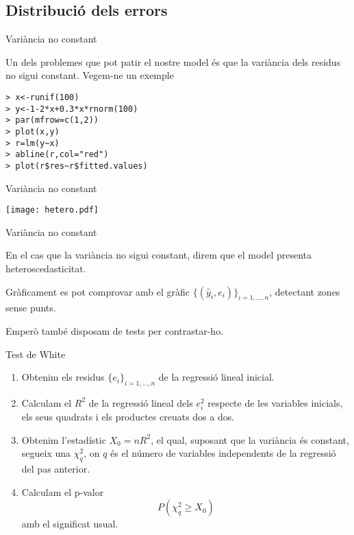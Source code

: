 \documentclass[12pt,t]{beamer}
\renewcommand{\emph}[1]{{\color{red}#1}}
\renewcommand{\geq}{\geqslant}
\theoremstyle{plain}
\theoremstyle{definition}
\begin{document}
\subsection{Distribució dels errors}
\begin{frame}[fragile]{Variància no constant}

Un dels problemes que pot patir el nostre model és que la variància dels residus no sigui constant. Vegem-ne un exemple

\begin{verbatim}
> x<-runif(100)
> y<-1-2*x+0.3*x*rnorm(100)
> par(mfrow=c(1,2))
> plot(x,y)
> r=lm(y~x)
> abline(r,col="red")
> plot(r$res~r$fitted.values)
\end{verbatim}

\end{frame}

\begin{frame}[fragile]{Variància no constant}
\begin{center}
\texttt{[image: hetero.pdf]}
\end{center}
\end{frame}

\begin{frame}{Variància no constant}

En el cas que la variància no sigui constant, direm que el model presenta \emph{heteroscedasticitat}.

\vspace{0.25cm}

Gràficament es pot comprovar amb el gràfic $\{(\hat{y}_i,e_i)\}_{i=1,\ldots,n}$, detectant zones sense punts.

\vspace{0.25cm}

Emperò també disposam de tests per contrastar-ho.

\end{frame}

\begin{frame}{Test de White}
\begin{enumerate}
\item Obtenim els residus $\{e_i\}_{i=1,\ldots,n}$  de la regressió lineal inicial.
\item Calculam el $R^2$ de la regressió lineal dels $e_i^2$ respecte de les variables inicials, els seus quadrats i els productes creuats dos a dos.
\item Obtenim l'estadístic $X_0=nR^2$, el qual, suposant que la variància és constant, segueix una $\chi^2_q$, on $q$ és el número de variables independents de la regressió del pas anterior.
\item Calculam el p-valor 
$$P(\chi_q^2\geq X_0)$$
 amb el significat usual.
\end{enumerate}
\end{frame}
\end{document}
